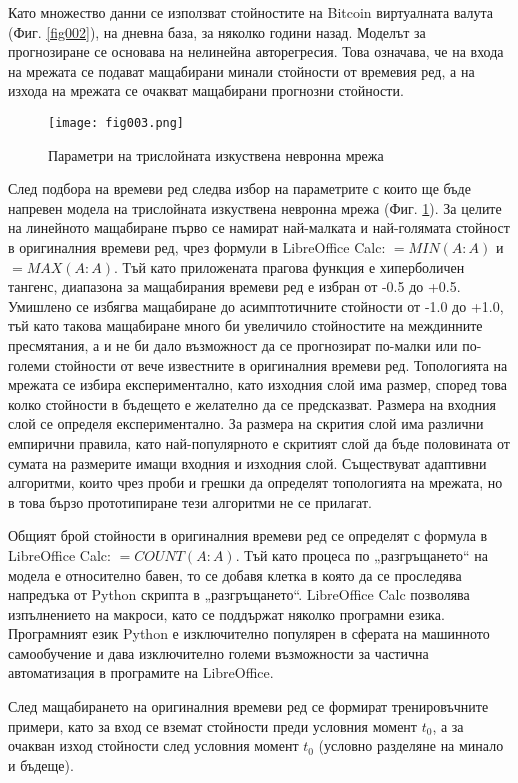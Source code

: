 Като множество данни се използват стойностите на Bitcoin виртуалната валута (Фиг. \ref{fig002}), на дневна база, за няколко години назад. Моделът за прогнозиране се основава на нелинейна авторегресия. Това означава, че на входа на мрежата се подават мащабирани минали стойности от времевия ред, а на изхода на мрежата се очакват мащабирани прогнозни стойности. 

\begin{figure}[h]
  \centering
  \texttt{[image: fig003.png]}
  \caption{Параметри на трислойната изкуствена невронна мрежа}
\label{fig003}
\end{figure}

След подбора на времеви ред следва избор на параметрите с които ще бъде напревен модела на трислойната изкуствена невронна мрежа (Фиг. \ref{fig003}). За целите на линейното мащабиране първо се намират най-малката и най-голямата стойност в оригиналния времеви ред, чрез формули в LibreOffice Calc: $=MIN(A:A)$ и $=MAX(A:A)$. Тъй като приложената прагова функция е хиперболичен тангенс, диапазона за мащабирания времеви ред е избран от -0.5 до +0.5. Умишлено се избягва мащабиране до асимптотичните стойности от -1.0 до +1.0, тъй като такова мащабиране много би увеличило стойностите на междинните пресмятания, а и не би дало възможност да се прогнозират по-малки или по-големи стойности от вече известните в оригиналния времеви ред. Топологията на мрежата се избира експериментално, като изходния слой има размер, според това колко стойности в бъдещето е желателно да се предсказват. Размера на входния слой се определя експериментално. За размера на скрития слой има различни емпирични правила, като най-популярното е скритият слой да бъде половината от сумата на размерите имащи входния и изходния слой. Съществуват адаптивни алгоритми, които чрез проби и грешки да определят топологията на мрежата, но в това бързо прототипиране тези алгоритми не се прилагат. 

Общият брой стойности в оригиналния времеви ред се определят с формула в LibreOffice Calc: $=COUNT(A:A)$. Тъй като процеса по „разгръщането“ на модела е относително бавен, то се добавя клетка в която да се проследява напредъка от Python скрипта в „разгръщането“. LibreOffice Calc позволява изпълнението на макроси, като се поддържат няколко програмни езика. Програмният език Python е изключително популярен в сферата на машинното самообучение и дава изключително големи възможности за частична автоматизация в програмите на LibreOffice.

След мащабирането на оригиналния времеви ред се формират тренировъчните примери, като за вход се вземат стойности преди условния момент $t_0$, а за очакван изход стойности след условния момент $t_0$ (условно разделяне на минало и бъдеще).


